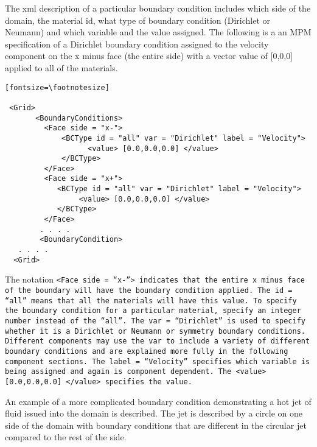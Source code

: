 The xml description of a particular boundary condition includes which
side of the domain, the material id, what type of boundary condition
(Dirichlet or Neumann) and which variable and the value assigned.  The
following is a an MPM specification of a Dirichlet boundary condition
assigned to the velocity component on the x minus face (the entire
side) with a vector value of [0,0,0] applied to all of the materials.

\begin{verbatim}[fontsize=\footnotesize]

 <Grid>
       <BoundaryConditions>
         <Face side = "x-">
             <BCType id = "all" var = "Dirichlet" label = "Velocity">
                   <value> [0.0,0.0,0.0] </value>
             </BCType>
         </Face>
         <Face side = "x+">
            <BCType id = "all" var = "Dirichlet" label = "Velocity">
                 <value> [0.0,0.0,0.0] </value>
            </BCType>
         </Face>
        . . . .
        <BoundaryCondition>
   . . . .
  <Grid>

\end{verbatim}

The notation \tt <Face side = ``x-''> \normalfont indicates that the
entire x minus face of the boundary will have the boundary condition
applied.  The \tt id = ``all'' \normalfont means that all the
materials will have this value.  To specify the boundary condition for
a particular material, specify an integer number instead of the
``all''.  The \tt var = ``Dirichlet'' \normalfont is used to specify
whether it is a Dirichlet or Neumann or symmetry boundary conditions.
Different components may use the \tt var \normalfont to include a
variety of different boundary conditions and are explained more fully
in the following component sections.  The \tt label = ``Velocity''
\normalfont specifies which variable is being assigned and again is
component dependent.  The \tt <value> [0.0,0.0,0.0] </value>
\normalfont specifies the value.

An example of a more complicated boundary condition demonstrating a
hot jet of fluid issued into the domain is described.  The jet is
described by a circle on one side of the domain with boundary
conditions that are different in the circular jet compared to the rest
of the side.

